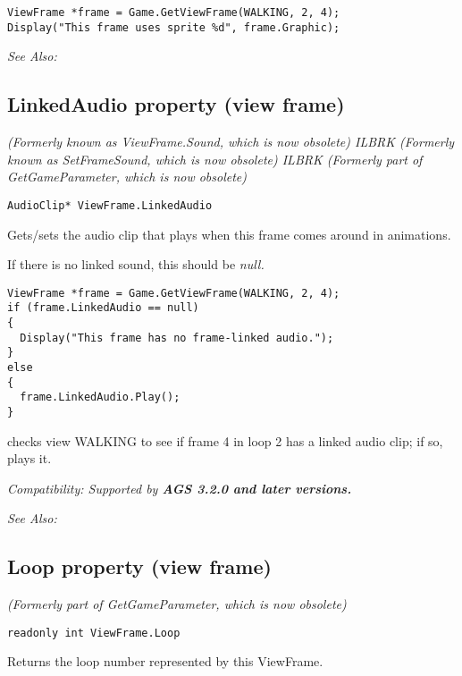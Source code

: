 \begin{verbatim}
ViewFrame *frame = Game.GetViewFrame(WALKING, 2, 4);
Display("This frame uses sprite %d", frame.Graphic);
\end{verbatim}

\it{See Also:} 


\subsection{LinkedAudio property (view frame)}\label{ViewFrame.LinkedAudio}%

\it{(Formerly known as ViewFrame.Sound, which is now obsolete)} ILBRK
\it{(Formerly known as SetFrameSound, which is now obsolete)} ILBRK
\it{(Formerly part of GetGameParameter, which is now obsolete)}

\begin{verbatim}
AudioClip* ViewFrame.LinkedAudio
\end{verbatim}
Gets/sets the audio clip that plays when this frame comes around in animations.

If there is no linked sound, this should be \it{null}.

\begin{verbatim}
ViewFrame *frame = Game.GetViewFrame(WALKING, 2, 4);
if (frame.LinkedAudio == null)
{
  Display("This frame has no frame-linked audio.");
}
else
{
  frame.LinkedAudio.Play();
}
\end{verbatim}
checks view WALKING to see if frame 4 in loop 2 has a linked audio clip; if so, plays it.

\it{Compatibility:} Supported by \bf{AGS 3.2.0} and later versions.

\it{See Also:} 


\subsection{Loop property (view frame)}\label{ViewFrame.Loop}%

\it{(Formerly part of GetGameParameter, which is now obsolete)}

\begin{verbatim}
readonly int ViewFrame.Loop
\end{verbatim}
Returns the loop number represented by this ViewFrame.

